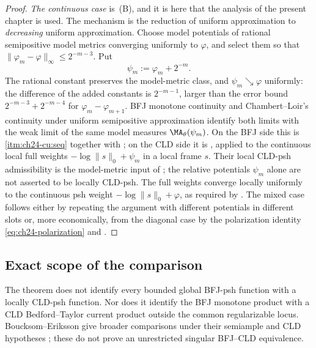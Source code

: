 \begin{proof}
\emph{The continuous case} is
\,(B), and it is here that the analysis of
the present chapter is used.  The mechanism is the reduction of uniform
approximation to \emph{decreasing} uniform approximation.  Choose model
potentials of rational semipositive model metrics converging uniformly
to $\varphi$, and select them so that
$\|\varphi_m-\varphi\|_\infty\leq2^{-m-3}$.  Put
\[
                    \psi_m:=\varphi_m+2^{-m}.
\]
The rational constant preserves the model-metric class, and
$\psi_m\searrow\varphi$ uniformly: the difference of the added constants
is $2^{-m-1}$, larger than the error bound
$2^{-m-3}+2^{-m-4}$ for $\varphi_m-\varphi_{m+1}$.
BFJ monotone continuity and Chambert--Loir's continuity under uniform
semipositive approximation identify both limits with the weak limit of the
same model measures $\MA_\theta(\psi_m)$.  On the BFJ side this is
\,\cref{itm:ch24-cu:seq} together with
; on the CLD side it is
, applied to the continuous local full
weights $-\log\|s\|_0+\psi_m$ in a local frame $s$.
Their local CLD-psh admissibility is the model-metric input of
; the relative potentials $\psi_m$
alone are not asserted to be locally CLD-psh.  The full weights converge
locally uniformly to the continuous psh weight $-\log\|s\|_0+\varphi$,
as required by \cite[Proposition~8.7.2]{CLD25}.  The mixed case follows either by repeating the argument with
different potentials in different slots or, more economically, from the
diagonal case by the polarization identity
\eqref{eq:ch24-polarization} and .
\end{proof}

\subsection{Exact scope of the comparison}
\label{sec:ch24-scope-comparison}

\begin{remark}
\label{rem:ch24-comparison-boundary}
The theorem does not identify every bounded global BFJ-psh function with a
locally CLD-psh function. Nor does it identify the BFJ monotone product with
a CLD Bedford--Taylor current product outside the common regularizable
locus. Boucksom--Eriksson give broader comparisons under their semiample and
CLD hypotheses \cite[Theorems~7.14 and~8.4]{BE21}; these do not prove an
unrestricted singular BFJ--CLD equivalence.
\end{remark}

